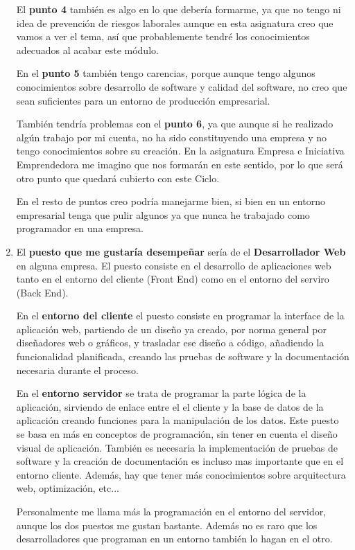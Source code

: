 \begin{enumerate}[label=(\alph*)]
     El \textbf{punto 4} también es algo en lo que debería formarme, ya que no tengo ni idea de prevención de riesgos laborales aunque en esta asignatura creo que vamos a ver el tema, así que probablemente tendré los conocimientos adecuados al acabar este módulo.

     En el \textbf{punto 5} también tengo carencias, porque aunque tengo algunos conocimientos sobre desarrollo de software y calidad del software, no creo que sean suficientes para un entorno de producción empresarial.

     También tendría problemas con el \textbf{punto 6}, ya que aunque si he realizado algún trabajo por mi cuenta, no ha sido constituyendo una empresa y no tengo conocimientos sobre su creación. En la asignatura Empresa e Iniciativa Emprendedora me imagino que nos formarán en este sentido, por lo que será otro punto que quedará cubierto con este Ciclo.

     En el resto de puntos creo podría manejarme bien, si bien en un entorno empresarial tenga que pulir algunos ya que nunca he trabajado como programador en una empresa.

     \item El\textbf{ puesto que me gustaría desempeñar} sería de el \textbf{Desarrollador Web} en alguna empresa. El puesto consiste en el desarrollo de aplicaciones web tanto en el entorno del cliente (Front End) como en el entorno del serviro (Back End).

     En el \textbf{entorno del cliente} el puesto consiste en programar la interface de la aplicación web, partiendo de un diseño ya creado, por norma general por diseñadores web o gráficos, y trasladar ese diseño a código, añadiendo la funcionalidad planificada, creando las pruebas de software y la documentación necesaria durante el proceso.

     En el \textbf{entorno servidor} se trata de programar la parte lógica de la aplicación, sirviendo de enlace entre el el cliente y la base de datos de la aplicación creando funciones para la manipulación de los datos. Este puesto se basa en más en conceptos de programación, sin tener en cuenta el diseño visual de aplicación. También es necesaria la implementación de pruebas de software y la creación de documentación es incluso mas importante que en el entorno cliente. Además, hay que tener más conocimientos sobre arquitectura web, optimización, etc...

     Personalmente me llama más la programación en el entorno del servidor, aunque los dos puestos me gustan bastante. Además no es raro que los desarrolladores que programan en un entorno también lo hagan en el otro.
\end{enumerate}

